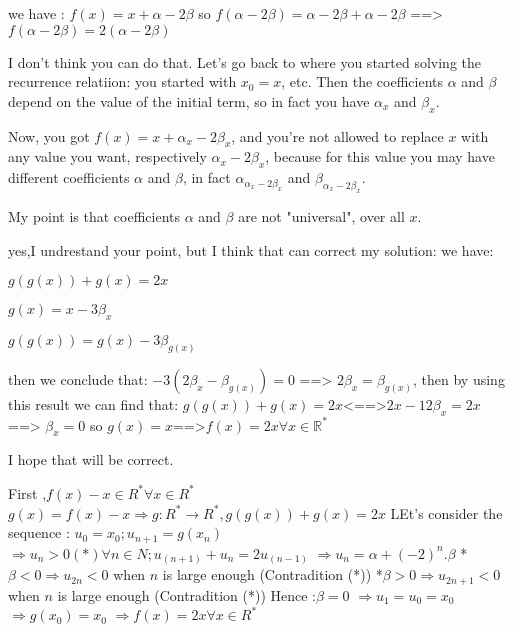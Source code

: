 \begin{solution}
	we have : $ f(x)=x+\alpha-2\beta$ so $ f(\alpha-2\beta)=\alpha-2\beta+\alpha-2\beta$ ==> $ f(\alpha-2\beta)=2(\alpha-2\beta)$
\end{solution}



\begin{solution}
	I don't think you can do that. Let's go back to where you started solving the recurrence relatiion: you started with $ x_0 = x$, etc. Then the coefficients $ \alpha$ and $ \beta$ depend on the value of the initial term, so in fact you have $ \alpha_x$ and $ \beta_x$.

Now, you got $ f(x) = x + \alpha_x - 2\beta_x$, and you're not allowed to replace $ x$ with any value you want, respectively $ \alpha_x - 2\beta_x$, because for this value you may have different coefficients $ \alpha$ and $ \beta$, in fact $ \alpha_{\alpha_x - 2\beta_x}$ and $ \beta_{\alpha_x - 2\beta_x}$.

My point is that coefficients $ \alpha$ and $ \beta$ are not "universal", over all $ x$.
\end{solution}



\begin{solution}
	yes,I undrestand your point, but I think that can correct my solution:
we have: 

$ g(g(x)) + g(x) = 2x$

$ g(x) = x - 3\beta_{x}$

$ g(g(x)) = g(x) - 3\beta_{g(x)}$

then we conclude that: $ - 3(2\beta_{x} - \beta_{g(x)}) = 0$ ==> $ 2\beta_{x} = \beta_{g(x)}$, then by using this result we can find that: $ g(g(x)) + g(x) = 2x$<==>$ 2x - 12\beta_{x} = 2x$ ==> $ \beta_{x} = 0$ so $ g(x) = x$==>$ f(x) = 2x \forall x\in{\mathbb{R^{*}}}$

I hope that will be correct.
\end{solution}



\begin{solution}
	First ,$ f(x)-x \in R^* \forall x \in R^*$
$ g(x)=f(x)-x \Rightarrow g: R^* \rightarrow R^*  , g(g(x))+g(x)=2x$
LEt's consider the sequence :  $ u_0=x_0; u_{n+1}=g(x_n)$
$ \Rightarrow u_n>0 (*) \forall n \in N ;  u_(n+1)+u_n=2u_(n-1)$
$ \Rightarrow u_n=\alpha+(-2)^n .\beta$
* $ \beta <0 \Rightarrow u_{2n}<0$ when $ n$ is large enough (Contradition (*))
*$ \beta>0\Rightarrow u_{2n+1}<0$ when $ n$ is large enough (Contradition (*))
Hence :$ \beta=0$
$ \Rightarrow u_1=u_0=x_0$
$ \Rightarrow g(x_0)=x_0$
$ \Rightarrow f(x)=2x \forall x \in R^*$
\end{solution}



